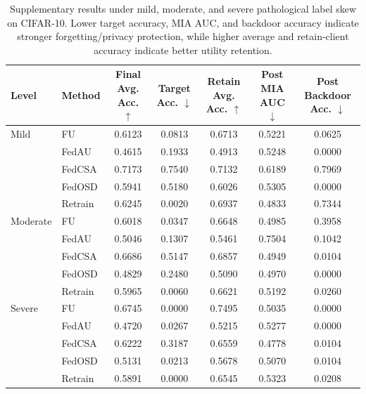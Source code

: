 \begin{table}[t]
\centering
\caption{Supplementary results under mild, moderate, and severe pathological label skew on CIFAR-10. Lower target accuracy, MIA AUC, and backdoor accuracy indicate stronger forgetting/privacy protection, while higher average and retain-client accuracy indicate better utility retention.}
\label{tab:heterogeneity_results}
\begin{tabular}{llccccc}
\toprule
Level & Method & Final Avg. Acc. $\uparrow$ & Target Acc. $\downarrow$ & Retain Avg. Acc. $\uparrow$ & Post MIA AUC $\downarrow$ & Post Backdoor Acc. $\downarrow$ \\
\midrule
Mild & FU & 0.6123 & 0.0813 & 0.6713 & 0.5221 & 0.0625 \\
 & FedAU & 0.4615 & 0.1933 & 0.4913 & 0.5248 & 0.0000 \\
 & FedCSA & 0.7173 & 0.7540 & 0.7132 & 0.6189 & 0.7969 \\
 & FedOSD & 0.5941 & 0.5180 & 0.6026 & 0.5305 & 0.0000 \\
 & Retrain & 0.6245 & 0.0020 & 0.6937 & 0.4833 & 0.7344 \\
\midrule
Moderate & FU & 0.6018 & 0.0347 & 0.6648 & 0.4985 & 0.3958 \\
 & FedAU & 0.5046 & 0.1307 & 0.5461 & 0.7504 & 0.1042 \\
 & FedCSA & 0.6686 & 0.5147 & 0.6857 & 0.4949 & 0.0104 \\
 & FedOSD & 0.4829 & 0.2480 & 0.5090 & 0.4970 & 0.0000 \\
 & Retrain & 0.5965 & 0.0060 & 0.6621 & 0.5192 & 0.0260 \\
\midrule
Severe & FU & 0.6745 & 0.0000 & 0.7495 & 0.5035 & 0.0000 \\
 & FedAU & 0.4720 & 0.0267 & 0.5215 & 0.5277 & 0.0000 \\
 & FedCSA & 0.6222 & 0.3187 & 0.6559 & 0.4778 & 0.0104 \\
 & FedOSD & 0.5131 & 0.0213 & 0.5678 & 0.5070 & 0.0104 \\
 & Retrain & 0.5891 & 0.0000 & 0.6545 & 0.5323 & 0.0208 \\
\bottomrule
\end{tabular}
\end{table}